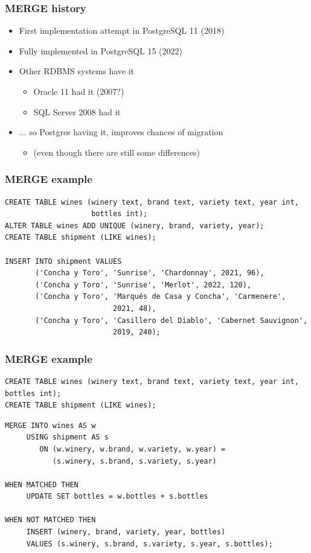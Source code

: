 \documentclass[ignorenonframetext,t]{beamer}
\begin{document}
\begin{frame}
  \frametitle{MERGE history}
  \begin{itemize}
    \item First implementation attempt in PostgreSQL 11 (2018)
    \item Fully implemented in PostgreSQL 15 (2022)
    \item Other RDBMS systems have it
      \begin{itemize}
	\item Oracle\texttrademark{} 11 had it (2007?)
	\item SQL Server\texttrademark{} 2008 had it
      \end{itemize}
      \pause
    \item ... so Postgres having it, improves chances of migration
    \begin{itemize} \item (even though there are still some differences) \end{itemize}
  \end{itemize}
\end{frame}


\begin{frame}[fragile]
  \frametitle{MERGE example}

  \begin{lstlisting}
CREATE TABLE wines (winery text, brand text, variety text, year int,
                    bottles int);
ALTER TABLE wines ADD UNIQUE (winery, brand, variety, year);
CREATE TABLE shipment (LIKE wines);

INSERT INTO shipment VALUES
       ('Concha y Toro', 'Sunrise', 'Chardonnay', 2021, 96),
       ('Concha y Toro', 'Sunrise', 'Merlot', 2022, 120),
       ('Concha y Toro', 'Marqués de Casa y Concha', 'Carmenere',
                         2021, 48),
       ('Concha y Toro', 'Casillero del Diablo', 'Cabernet Sauvignon',
                         2019, 240);
\end{lstlisting}
\end{frame}

\begin{frame}[fragile]
  \frametitle{MERGE example}

  \begin{lstlisting}[basicstyle=\tiny]
CREATE TABLE wines (winery text, brand text, variety text, year int, bottles int);
CREATE TABLE shipment (LIKE wines);
\end{lstlisting}

\begin{lstlisting}
MERGE INTO wines AS w
     USING shipment AS s
        ON (w.winery, w.brand, w.variety, w.year) =
           (s.winery, s.brand, s.variety, s.year)

WHEN MATCHED THEN
     UPDATE SET bottles = w.bottles + s.bottles

WHEN NOT MATCHED THEN
     INSERT (winery, brand, variety, year, bottles)
     VALUES (s.winery, s.brand, s.variety, s.year, s.bottles);
\end{lstlisting}
\end{frame}
\end{document}
